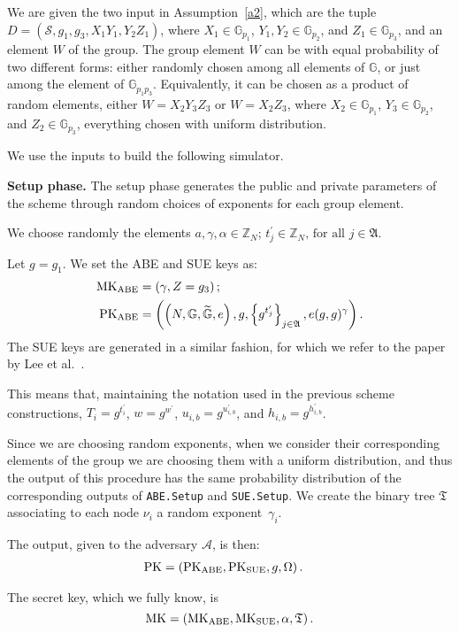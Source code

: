 \documentclass[a4paper,10pt]{article}
\newcommand{\G}{\mathbb{G}}
\newcommand{\GT}{\widetilde{\G}} \newcommand{\N}{\mathbb{N}}
\newcommand{\Z}{\mathbb{Z}}
\newcommand{\tree}{\mathfrak{T}}
\newcommand{\algorithm}[2]{\texttt{#1.#2}}
\newcommand{\randomchoose}[1]{We choose randomly the element\ifstrequal{#1}{s}{}{s} }
\newcommand{\phase}[1]{\textbf{#1 phase.} \hspace{0pt}}
\newcommand{\disclaimerSUE}{The SUE keys are generated in a similar fashion, for which we refer to the paper by Lee et al.~\cite{lee2013RSABE}.

}
\begin{document}
		We are given the two input in Assumption~\ref{a2}, which are the tuple \linebreak$D=\left(\mathscr{S},g_1,g_3,X_1Y_1,Y_2Z_1\right)$, where $X_1\in\G_{p_1}$, $Y_1,Y_2\in\G_{p_2}$, and $Z_1\in\G_{p_3}$, and an element $W$ of the group.
		The group element $W$ can be with equal probability of two different forms: either randomly chosen among all elements of $\G$, or just among the element of $\G_{p_1p_3}$. Equivalently, it can be chosen as a product of random elements, either $W=X_2Y_3Z_3$ or $W=X_2Z_3$, where $X_2\in\G_{p_1}$, $Y_3\in\G_{p_2}$, and $Z_2\in\G_{p_3}$, everything chosen with uniform distribution.
		
	We use the inputs to build the following simulator.
	
	\phase{Setup}
	The setup phase generates the public and private parameters of the scheme through random choices of exponents for each group element.
	
	\randomchoose{p}{$a,\gamma,\alpha\in\Z_N$;
		$t_j^\prime \in \Z_N\text{, for all }j\in \mathfrak{A}$.
	}
	
	Let $g=g_1$. We set the ABE and SUE keys as:
	\begin{align*}
		\mathrm{MK}_{\textnormal{ABE}}&=\left( \gamma, Z=g_3 \right);\\
\mathrm{PK}_{\textnormal{ABE}}&=\left( \left(N,\G,\GT,e\right), g, \left\{g^{t^\prime_j}\right\}_{j\in \mathfrak{A}}, e(g,g)^\gamma \right).
\end{align*}
	\disclaimerSUE{}
		This means that, maintaining the notation used in the previous scheme constructions, $T_i=g^{t^\prime_i}$, $w=g^{w^\prime}$, $u_{i,b}=g^{u^\prime_{i,b}}$, and $h_{i,b}=g^{h^\prime_{i,b}}$.
	
	Since we are choosing random exponents, when we consider their corresponding elements of the group we are choosing them with a uniform distribution, and thus the output of this procedure has the same probability distribution of the corresponding outputs of \algorithm{ABE}{Setup} and \algorithm{SUE}{Setup}.
	We create the binary tree $\tree$ associating to each node $\nu_i$ a random exponent~$\gamma_{i}$.
	
	The output, given to the adversary $\mathcal{A}$, is then:
	\begin{align*}
		\mathrm{PK}&=\left( \mathrm{PK}_{\textnormal{ABE}}, \mathrm{PK}_{\textnormal{SUE}}, g, \Omega \right).
	\end{align*}
	
	The secret key, which we fully know, is \[
		\mathrm{MK}=\left( \mathrm{MK}_{\textnormal{ABE}}, \mathrm{MK}_{\textnormal{SUE}}, \alpha, \tree \right).
	\]
	
\end{document}
